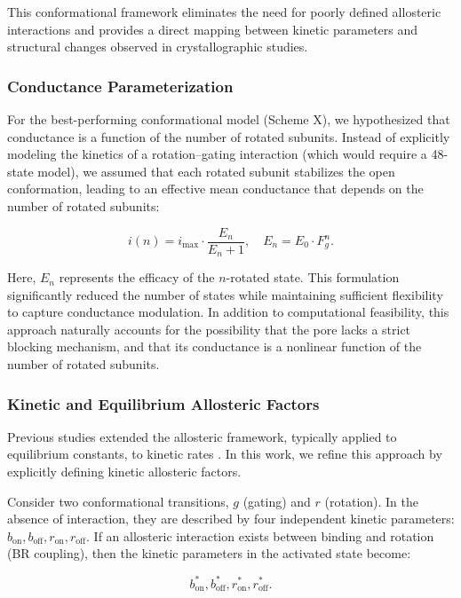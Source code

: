 \documentclass[pdflatex,sn-mathphys-num]{sn-jnl}%
\theoremstyle{thmstyleone}%
\theoremstyle{thmstyletwo}%
\theoremstyle{thmstylethree}%
\begin{document}
This conformational framework eliminates the need for poorly defined allosteric interactions and provides a direct mapping between kinetic parameters and structural changes observed in crystallographic studies.

\subsubsection{Conductance Parameterization}

For the best-performing conformational model (Scheme X), we hypothesized that conductance is a function of the number of rotated subunits. Instead of explicitly modeling the kinetics of a rotation–gating interaction (which would require a 48-state model), we assumed that each rotated subunit stabilizes the open conformation, leading to an effective mean conductance that depends on the number of rotated subunits:

\[
i(n) = i_{\text{max}} \cdot \frac{E_n}{E_n + 1}, \quad E_n = E_0 \cdot F_g^n.
\]

Here, \( E_n \) represents the efficacy of the \( n \)-rotated state. This formulation significantly reduced the number of states while maintaining sufficient flexibility to capture conductance modulation. In addition to computational feasibility, this approach naturally accounts for the possibility that the pore lacks a strict blocking mechanism, and that its conductance is a nonlinear function of the number of rotated subunits.

\subsubsection{Kinetic and Equilibrium Allosteric Factors}

Previous studies extended the allosteric framework, typically applied to equilibrium constants, to kinetic rates \cite{Moffatt_hume}. In this work, we refine this approach by explicitly defining kinetic allosteric factors.

Consider two conformational transitions, \( g \) (gating) and \( r \) (rotation). In the absence of interaction, they are described by four independent kinetic parameters: \( b_{\text{on}}, b_{\text{off}}, r_{\text{on}}, r_{\text{off}} \). If an allosteric interaction exists between binding and rotation (BR coupling), then the kinetic parameters in the activated state become:

\[
b^*_{\text{on}}, b^*_{\text{off}}, r^*_{\text{on}}, r^*_{\text{off}}.
\]
\end{document}
